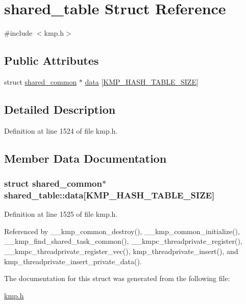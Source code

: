\hypertarget{structshared__table}{\section{shared\-\_\-table Struct Reference}
\label{structshared__table}
}


{\ttfamily \#include $<$kmp.\-h$>$}

\subsection*{Public Attributes}
\begin{DoxyCompactItemize}
\item 
struct \hyperlink{structshared__common}{shared\-\_\-common} $\ast$ \hyperlink{structshared__table_acbe02cd3db1cddd2f658db7e64c2bfc5}{data} \mbox{[}\hyperlink{kmp_8h_a18bbfe585fccb920012f9477c07977b7}{K\-M\-P\-\_\-\-H\-A\-S\-H\-\_\-\-T\-A\-B\-L\-E\-\_\-\-S\-I\-Z\-E}\mbox{]}
\end{DoxyCompactItemize}


\subsection{Detailed Description}


Definition at line 1524 of file kmp.\-h.



\subsection{Member Data Documentation}
\hypertarget{structshared__table_acbe02cd3db1cddd2f658db7e64c2bfc5}{
\subsubsection[{data}]{\setlength{\rightskip}{0pt plus 5cm}struct {\bf shared\-\_\-common}$\ast$ shared\-\_\-table\-::data\mbox{[}{\bf K\-M\-P\-\_\-\-H\-A\-S\-H\-\_\-\-T\-A\-B\-L\-E\-\_\-\-S\-I\-Z\-E}\mbox{]}}}\label{structshared__table_acbe02cd3db1cddd2f658db7e64c2bfc5}


Definition at line 1525 of file kmp.\-h.



Referenced by \-\_\-\-\_\-kmp\-\_\-common\-\_\-destroy(), \-\_\-\-\_\-kmp\-\_\-common\-\_\-initialize(), \-\_\-\-\_\-kmp\-\_\-find\-\_\-shared\-\_\-task\-\_\-common(), \-\_\-\-\_\-kmpc\-\_\-threadprivate\-\_\-register(), \-\_\-\-\_\-kmpc\-\_\-threadprivate\-\_\-register\-\_\-vec(), kmp\-\_\-threadprivate\-\_\-insert(), and kmp\-\_\-threadprivate\-\_\-insert\-\_\-private\-\_\-data().



The documentation for this struct was generated from the following file\-:\begin{DoxyCompactItemize}
\item 
\hyperlink{kmp_8h}{kmp.\-h}\end{DoxyCompactItemize}
